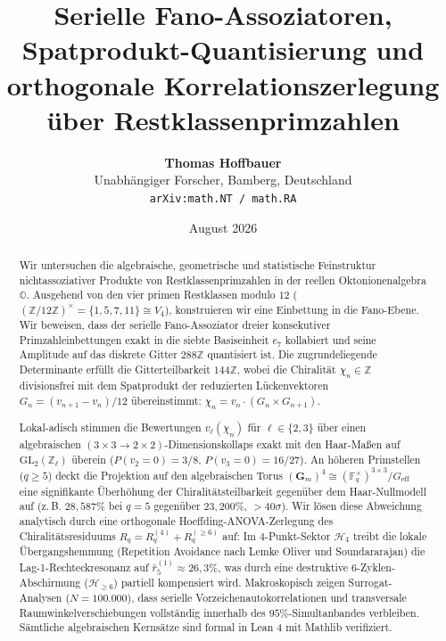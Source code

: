 \documentclass[11pt,a4paper]{article}
\title{\textbf{Serielle Fano-Assoziatoren, Spatprodukt-Quantisierung und orthogonale Korrelationszerlegung über Restklassenprimzahlen}}
\author{\textbf{Thomas Hoffbauer}\\
\small Unabhängiger Forscher, Bamberg, Deutschland\\
\small\texttt{arXiv:math.NT / math.RA}}
\date{August 2026}
\theoremstyle{definition}
\theoremstyle{remark}
\begin{document}
\maketitle

\begin{abstract}
Wir untersuchen die algebraische, geometrische und statistische Feinstruktur nichtassoziativer Produkte von Restklassenprimzahlen in der reellen Oktonionenalgebra $\mathbb{O}$. Ausgehend von den vier primen Restklassen modulo $12$ ($(\mathbb{Z}/12\mathbb{Z})^\times = \{1, 5, 7, 11\} \cong V_4$), konstruieren wir eine Einbettung in die Fano-Ebene. Wir beweisen, dass der serielle Fano-Assoziator dreier konsekutiver Primzahleinbettungen exakt in die siebte Basiseinheit $e_7$ kollabiert und seine Amplitude auf das diskrete Gitter $288\mathbb{Z}$ quantisiert ist. Die zugrundeliegende Determinante erfüllt die Gitterteilbarkeit $144\mathbb{Z}$, wobei die Chiralität $\chi_n \in \mathbb{Z}$ divisionsfrei mit dem Spatprodukt der reduzierten Lückenvektoren $G_n = (v_{n+1}-v_n)/12$ übereinstimmt: $\chi_n = v_n \cdot (G_n \times G_{n+1})$.

Lokal-adisch stimmen die Bewertungen $v_\ell(\chi_n)$ für $\ell \in \{2, 3\}$ über einen algebraischen $(3\times 3 \to 2\times 2)$-Dimensionskollaps exakt mit den Haar-Maßen auf $\mathrm{GL}_2(\mathbb{Z}_\ell)$ überein ($P(v_2=0)=3/8$, $P(v_3=0)=16/27$). An höheren Primstellen ($q \ge 5$) deckt die Projektion auf den algebraischen Torus $(\mathbf{G}_m)^4 \cong (\mathbb{F}_q^\times)^{3\times 3}/G_{\mathrm{eff}}$ eine signifikante Überhöhung der Chiralitätsteilbarkeit gegenüber dem Haar-Nullmodell auf (z.\,B. $28{,}587\%$ bei $q=5$ gegenüber $23{,}200\%$, $>40\sigma$). Wir lösen diese Abweichung analytisch durch eine orthogonale Hoeffding-ANOVA-Zerlegung des Chiralitätsresiduums $R_q = R_q^{(4)} + R_q^{(\ge 6)}$ auf: Im $4$-Punkt-Sektor $\mathcal{H}_4$ treibt die lokale Übergangshemmung (Repetition Avoidance nach Lemke Oliver und Soundararajan) die Lag-1-Rechteckresonanz auf $\bar{r}_5^{(1)} \approx 26{,}3\%$, was durch eine destruktive $6$-Zyklen-Abschirmung ($\mathcal{H}_{\ge 6}$) partiell kompensiert wird. Makroskopisch zeigen Surrogat-Analysen ($N = 100.000$), dass serielle Vorzeichenautokorrelationen und transversale Raumwinkelverschiebungen vollständig innerhalb des $95\%$-Simultanbandes verbleiben. Sämtliche algebraischen Kernsätze sind formal in Lean 4 mit Mathlib verifiziert.
\end{abstract}

\tableofcontents
\newpage
\end{document}
